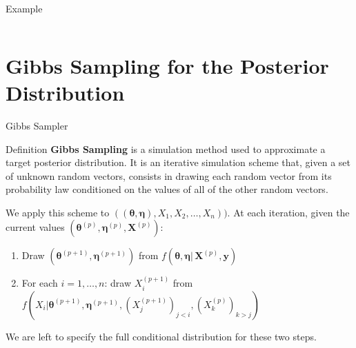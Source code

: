 \documentclass[aspectratio=169,xcolor=dvipsnames]{beamer}
\newcommand{\vecy}{\textbf{y}}
\newcommand{\matx}{\textbf{X}}
\newcommand{\veceta}{\boldsymbol{\eta}}
\newcommand{\vectheta}{\boldsymbol{\theta}}
\begin{document}
\begin{frame}{Example}
\begin{columns}
\begin{column}{.5\textwidth}
\begin{center}
 
    \end{center}
    
    
  
   
    \end{column}

    
\end{columns}
\end{frame}



\section{Gibbs Sampling for the Posterior Distribution}
\begin{frame}{Gibbs Sampler}
\begin{block}{Definition}
    \textbf{Gibbs Sampling} is a simulation method used to approximate a target posterior distribution. It is an iterative simulation scheme that, given a set of unknown random vectors, consists in drawing each random vector from its probability law conditioned on the values of all of the other random vectors.
\end{block}

\vspace{10pt}
We apply this scheme to $((\vectheta, \veceta), X_1, X_2, \dots, X_n)) $.  At each iteration, given the current values $(\vectheta^{(p)}, \veceta^{(p)}, \matx^{(p)})$:
\begin{enumerate}
    \item Draw $(\vectheta^{(p+1)}, \veceta^{(p+1)})$ from $f(\vectheta, \veceta | \, \matx^{(p)}, \vecy) $ 
    \item For each $i=1, \dots, n$: draw $X^{(p+1)}_i$ from $f(X_i| \vectheta^{(p+1)}, \veceta^{(p+1)}, (X_j^{(p+1)})_{j<i}, (X_k^{(p)})_{k>j} )$
\end{enumerate}

We are left to specify the full conditional distribution for these two steps.
\end{frame}
\end{document}
